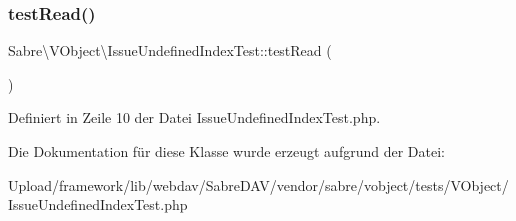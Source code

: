 \subsubsection{\texorpdfstring{test\+Read()}{testRead()}}
{\footnotesize\ttfamily Sabre\textbackslash{}\+V\+Object\textbackslash{}\+Issue\+Undefined\+Index\+Test\+::test\+Read (\begin{DoxyParamCaption}{ }\end{DoxyParamCaption})}



Definiert in Zeile 10 der Datei Issue\+Undefined\+Index\+Test.\+php.



Die Dokumentation für diese Klasse wurde erzeugt aufgrund der Datei\+:\begin{DoxyCompactItemize}
\item 
Upload/framework/lib/webdav/\+Sabre\+D\+A\+V/vendor/sabre/vobject/tests/\+V\+Object/Issue\+Undefined\+Index\+Test.\+php\end{DoxyCompactItemize}
